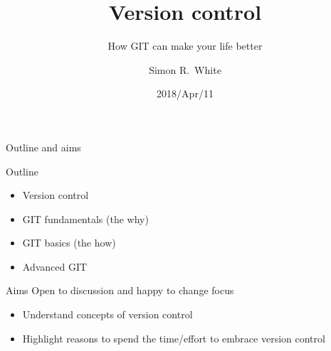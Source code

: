 


\title{Version control}
\subtitle{How GIT can make your life better}
\author{Simon R.~White}
\date{2018/Apr/11}



\maketitle








\begin{frame}{Outline and aims}
  
  \begin{block}{Outline}
    \begin{itemize}
    \item Version control
    \item GIT fundamentals (the why)
    \item GIT basics (the how)
    \item Advanced GIT
    \end{itemize}
  \end{block}

  \begin{block}{Aims}
    Open to discussion and happy to change focus
    \begin{itemize}
    \item Understand concepts of version control
    \item Highlight reasons to spend the time/effort to embrace
      version control
    \end{itemize}
  \end{block}

\end{frame}



